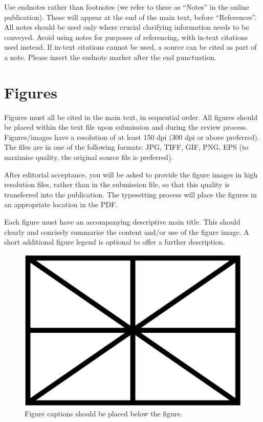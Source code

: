 \documentclass{article}
\begin{document}
Use endnotes rather than footnotes
(we refer to these as ``Notes'' in the online publication).
These will appear at the end of the main text, before ``References''.
All notes should be used only where crucial clarifying information
needs to be conveyed.
Avoid using notes for purposes of referencing, with in-text citations used
instead.
If in-text citations cannot be used, a source can be cited as part of a note.
Please insert the endnote marker after the end punctuation.

\section{Figures}\label{sec:figures}

Figures must all be cited in the main text, in sequential order.
All figures should be placed within the text file upon submission and during
the review process. Figures/images have a resolution of at least 150 dpi
(300 dpi or above preferred). The files are in one of the following formats:
JPG, TIFF, GIF, PNG, EPS (to maximise quality,
the original source file is preferred).

After editorial acceptance, you will be asked to provide the figure
images in high resolution files, rather than in the submission file,
so that this quality is transferred into the publication.
The typesetting process will place the figures in an appropriate
location in the PDF.

Each figure must have an accompanying descriptive main title.
This should clearly and concisely summarise the content and/or
use of the figure image.
A short additional figure legend is optional to offer a further description.

\begin{figure}[htbp]
  \centering
  \includegraphics[width=0.9\columnwidth]{figure}
  \caption{Figure captions should be placed below the figure.}
\label{fig:figure}
\end{figure}
\end{document}
